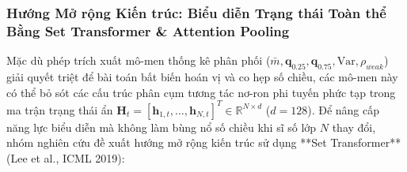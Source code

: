 \subsubsection{Hướng Mở rộng Kiến trúc: Biểu diễn Trạng thái Toàn thể Bằng Set Transformer \& Attention Pooling}\label{subsubsec:set-transformer-extension}
Mặc dù phép trích xuất mô-men thống kê phân phối ($\bar{m}, \mathbf{q}_{0.25}, \mathbf{q}_{0.75}, \text{Var}, \rho_{weak}$) giải quyết triệt để bài toán bất biến hoán vị và co hẹp số chiều, các mô-men này có thể bỏ sót các cấu trúc phân cụm tương tác nơ-ron phi tuyến phức tạp trong ma trận trạng thái ẩn $\mathbf{H}_t = [\mathbf{h}_{1, t}, \dots, \mathbf{h}_{N, t}]^T \in \mathbb{R}^{N \times d}$ ($d=128$). Để nâng cấp năng lực biểu diễn mà không làm bùng nổ số chiều khi sĩ số lớp $N$ thay đổi, nhóm nghiên cứu đề xuất hướng mở rộng kiến trúc sử dụng **Set Transformer** (Lee et al., ICML 2019):

